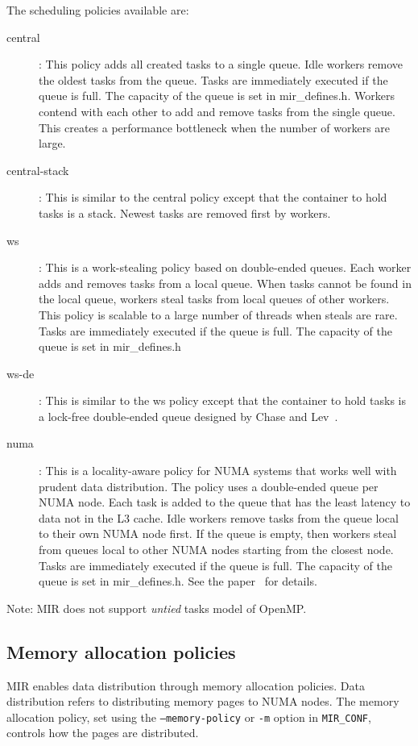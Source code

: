 \documentclass[11pt,a4paper]{article}
\begin{document}
The scheduling policies available are:
\begin{description}
    \item[central]: This policy adds all created tasks to a single queue. Idle workers remove the oldest tasks from the queue. Tasks are immediately executed if the queue is full. The capacity of the queue is set in \textsf{mir\_defines.h}. Workers contend with each other to add and remove tasks from the single queue. This creates a performance bottleneck when the number of workers are large.
    \item[central-stack]: This is similar to the central policy except that the container to hold tasks is a stack. Newest tasks are removed first by workers.
    \item[ws]: This is a work-stealing policy based on double-ended queues. Each worker adds and removes tasks from a local queue. When tasks cannot be found in the local queue, workers steal tasks from local queues of other workers. This policy is scalable to a large number of threads when steals are rare. Tasks are immediately executed if the queue is full. The capacity of the queue is set in \textsf{mir\_defines.h}
    \item[ws-de]: This is similar to the ws policy except that the container to hold tasks is a lock-free double-ended queue designed by Chase and Lev~\cite{Chase:2005:DCW:1073970.1073974}.
    \item[numa]: This is a locality-aware policy for NUMA systems that works well with prudent data distribution. The policy uses a double-ended queue per NUMA node. Each task is added to the queue that has the least latency to data not in the L3 cache. Idle workers remove tasks from the queue local to their own NUMA node first. If the queue is empty, then workers steal from queues local to other NUMA nodes starting from the closest node. Tasks are immediately executed if the queue is full. The capacity of the queue is set in \textsf{mir\_defines.h}. See the paper~\cite{muddukrishnalocality} for details.
\end{description}

Note: MIR does not support \textit{untied} tasks model of OpenMP.

\subsection{Memory allocation policies}\label{sec:memory-allocation-policies}

MIR enables data distribution through memory allocation policies. Data distribution refers to distributing memory pages to NUMA nodes. The memory allocation policy, set using the \texttt{--memory-policy} or \texttt{-m} option in \texttt{MIR\_CONF}, controls how the pages are distributed.
\end{document}
